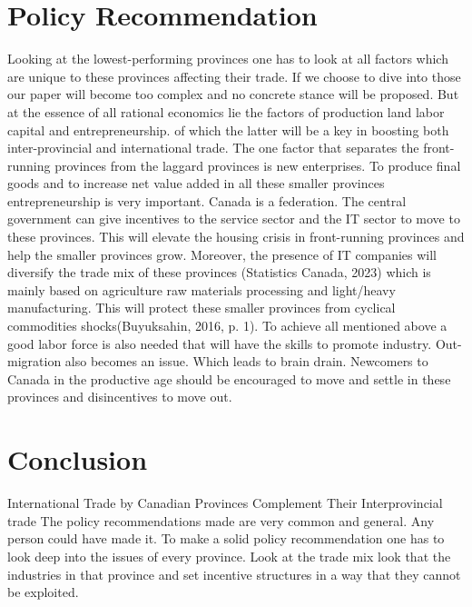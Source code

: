 \documentclass[12pt]{article}
\begin{document}
{\newpage
\section*{Policy Recommendation}{
Looking at the lowest-performing provinces one has to look at all factors which are unique to these provinces affecting their trade. If we choose to dive into those our paper will become too complex and no concrete stance will be proposed.
But at the essence of all rational economics lie the factors of production land labor capital and entrepreneurship. of which the latter will be a key in boosting both inter-provincial and international trade.
The one factor that separates the front-running provinces from the laggard provinces is new enterprises. To produce final goods and to increase net value added in all these smaller provinces entrepreneurship is very important. Canada is a federation. The central government can give incentives to the service sector and the IT sector to move to these provinces. This will elevate the housing crisis in front-running provinces and help the smaller provinces grow. Moreover, the presence of IT companies will diversify the trade mix of these provinces (Statistics Canada, 2023) which is mainly based on agriculture raw materials processing and light/heavy manufacturing. This will protect these smaller provinces from cyclical commodities shocks(Buyuksahin, 2016, p. 1).
To achieve all mentioned above a good labor force is also needed that will have the skills to promote industry. Out-migration also becomes an issue. Which leads to brain drain. Newcomers to Canada in the productive age should be encouraged to move and settle in these provinces and disincentives to move out. 
}
\newpage
\section*{Conclusion}{
International Trade by Canadian Provinces Complement Their Interprovincial trade
The policy recommendations made are very common and general. Any person could have made it. To make a solid policy recommendation one has to look deep into the issues of every province. Look at the trade mix look that the industries in that province and set incentive structures in a way that they cannot be exploited.

}


\newpage
}
\end{document}
